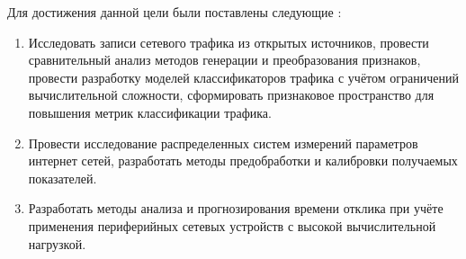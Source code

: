 

Для достижения данной цели были поставлены следующие {\tasks}:
\begin{enumerate}[beginpenalty=10000] 
	\item Исследовать записи сетевого трафика из открытых источников,  провести сравнительный анализ методов \phantom{ } генерации \phantom{ } и преобразования признаков, провести разработку моделей классификаторов трафика с учётом ограничений вычислительной сложности, сформировать признаковое пространство для повышения метрик классификации трафика.
	\item Провести исследование распределенных систем измерений параметров интернет сетей, разработать методы предобработки и калибровки получаемых показателей.
	\item Разработать методы анализа и прогнозирования времени отклика при учёте применения периферийных сетевых устройств с высокой вычислительной нагрузкой. 
\end{enumerate}



